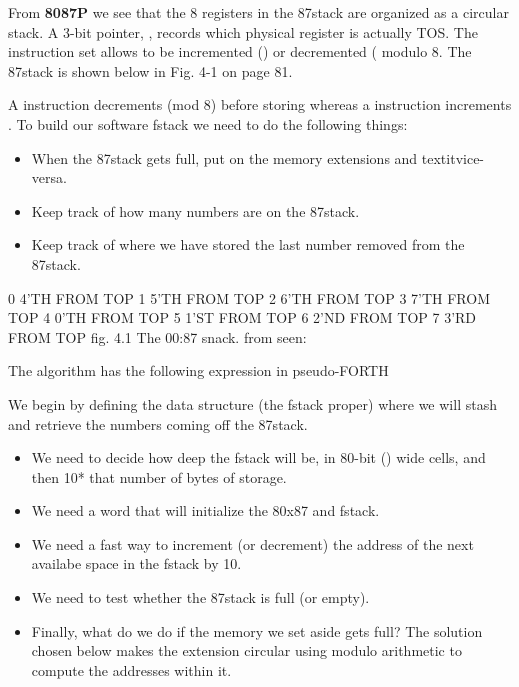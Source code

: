 {{{{{From \textbf{8087P} we see that the 8 registers in the 87stack are organized as a circular stack. A 3-bit pointer, , records which physical register is actually TOS. The instruction set allows  to be incremented () or decremented ( modulo 8. The 87stack is shown below in Fig. 4-1 on page 81.

A  instruction decrements  (mod 8) before storing whereas a  instruction increments . To build our software fstack we need to do the following things:
\begin{itemize}
    \item When the 87stack gets full, put  on the memory extensions and textit{vice-versa}.
    \item Keep track of how many numbers are on the 87stack.
    \item Keep track of where we have stored the last number removed from the 87stack.
\end{itemize}

\begin{listing}
0 4'TH FROM TOP
1 5'TH FROM TOP
2 6'TH FROM TOP
3 7'TH FROM TOP
4 0'TH FROM TOP
5 1'ST FROM TOP
6 2’ND FROM TOP
7 3'RD FROM TOP
fig. 4.1 The 00:87 snack. from seen:
\end{listing}

The algorithm has the following expression in pseudo-FORTH


We begin by defining the data structure (the fstack proper) where we will stash and retrieve the numbers coming off the 87stack.

\begin{itemize}
    \item We need to decide how deep the fstack will be, in 80-bit () wide cells, and then  10* that number of bytes of storage.
    \item We need a word that will initialize the 80x87 and fstack.
    \item We need a fast way to increment (or decrement) the address of the next availabe space in the fstack by 10.
    \item We need to test whether the 87stack is full (or empty).
    \item Finally, what do we do if the memory we set aside gets full? The solution chosen below makes the extension circular using modulo arithmetic to compute the addresses within it.
\end{itemize}

}}}}}
